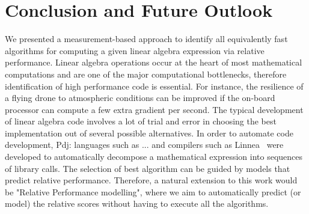 \documentclass[conference]{IEEEtran}
\newcommand{\p}[1]{{\color{blue} Pdj: #1}}
\begin{document}
\section{Conclusion and Future Outlook}
\label{sec:con}
We presented a measurement-based approach to identify all equivalently fast algorithms for computing a given linear
algebra expression via relative performance. Linear algebra operations occur at the heart of most mathematical
computations and are one of the major computational bottlenecks, therefore identification of high performance code is essential. For instance, the resilience of a flying drone to atmospheric conditions can be improved if the on-board processor can compute a few extra gradient per second. 
The typical development of linear algebra code involves a lot of trial and error in choosing the best implementation out
of several possible alternatives. In order to automate code development, \p{languages such as ...} and compilers such as
Linnea~\cite{barthels2019linnea} were developed to automatically decompose a mathematical expression into sequences of
library calls. 
The selection of best algorithm can be guided by models that predict relative performance. Therefore, a natural extension to this work would be "Relative Performance modelling", where we aim to automatically predict (or model) the relative scores without having to execute all the algorithms.



\end{document}
